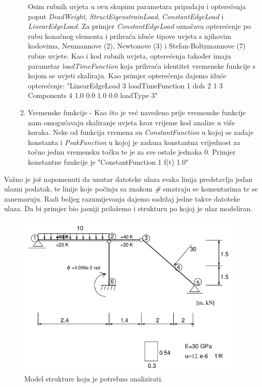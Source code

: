 \documentclass[a4paper,twoside,12pt]{memoir} %
\begin{document}
\begin{enumerate}
\begin{enumerate}
        Osim rubnih uvjeta u ovu skupinu parametara pripadaju i opterećenja poput \textit{DeadWeight}, \textit{StructEigenstrainLoad}, \textit{ConstantEdgeLoad} i \textit{LinearEdgeLoad}. Za primjer \textit{ConstantEdgeLoad} označava opterećenje po rubu konačnog elementa i prihvaća iduće tipove uvjeta s njihovim kodovima, Neumannove (2), Newtonove (3) i Stefan-Boltzmannove (7) rubne uvjete. Kao i kod rubnih uvjeta, opterećenja također imaju parametar \textit{loadTimeFunction} koja prihvaća identitet vremenske funkcije s kojom se uvjeti skaliraju. Kao primjer opterećenja dajemo iduće opterećenje: "LinearEdgeLoad 3 loadTimeFunction 1 dofs 2 1 3 Components 4 1.0 0.0 1.0 0.0 loadType 3"
        \item Vremenske funkcije - Kao što je već navedeno prije vremenske funkcije nam omogućavaju skaliranje uvjeta kroz vrijeme kod analize u više koraka. Neke od funkcija vremena su \textit{ConstantFunction} u kojoj se zadaje konstanta i \textit{PeakFunction} u kojoj je zadana konstantna vrijednost za točno jednu vremensku točku te je za sve ostale jednaka 0. Primjer konstantne funkcije je "ConstantFunction 1 f(t) 1.0"
    \end{enumerate}
\end{enumerate}

Važno je još napomenuti da unutar datoteke ulaza svaka linija predstavlja jedan ulazni podatak, te linije koje počinju sa znakom \textit{\#} smatraju se komentarima te se zanemaruju. Radi boljeg razumijevanja dajemo sadržaj jedne takve datoteke ulaza. Da bi primjer bio jasniji prilažemo i strukturu po kojoj je ulaz modeliran.

\begin{figure}[h!t]
\begin{center}
\includegraphics[scale=0.51]{pictures/chapter_oofem/structure_to_analyze.png}
\caption{Model strukture koju je potrebno analizirati. \cite{oofem-web}}
\label{fig:Structure_to_analyze}
\end{center}
\end{figure}
\end{document}
